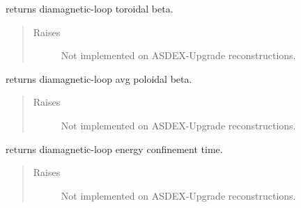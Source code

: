 \documentclass[letterpaper,10pt,english]{sphinxmanual}
\begin{document}
\begin{fulllineitems}
\begin{fulllineitems}
\begin{quote}
\begin{description}
\end{description}\end{quote}

\end{fulllineitems}


\begin{fulllineitems}
\label{\detokenize{eqtools:eqtools.AUGData.AUGDDData.getDiamagBetaT}}
returns diamagnetic-loop toroidal beta.
\begin{quote}\begin{description}
\item[{Raises}] \leavevmode
{} \textendash{} Not implemented on ASDEX-Upgrade reconstructions.

\end{description}\end{quote}

\end{fulllineitems}


\begin{fulllineitems}
\label{\detokenize{eqtools:eqtools.AUGData.AUGDDData.getDiamagBetaP}}
returns diamagnetic-loop avg poloidal beta.
\begin{quote}\begin{description}
\item[{Raises}] \leavevmode
{} \textendash{} Not implemented on ASDEX-Upgrade reconstructions.

\end{description}\end{quote}

\end{fulllineitems}


\begin{fulllineitems}
\label{\detokenize{eqtools:eqtools.AUGData.AUGDDData.getDiamagTauE}}
returns diamagnetic-loop energy confinement time.
\begin{quote}\begin{description}
\item[{Raises}] \leavevmode
{} \textendash{} Not implemented on ASDEX-Upgrade reconstructions.


\end{description}
\end{quote}
\end{fulllineitems}
\end{fulllineitems}
\end{document}
